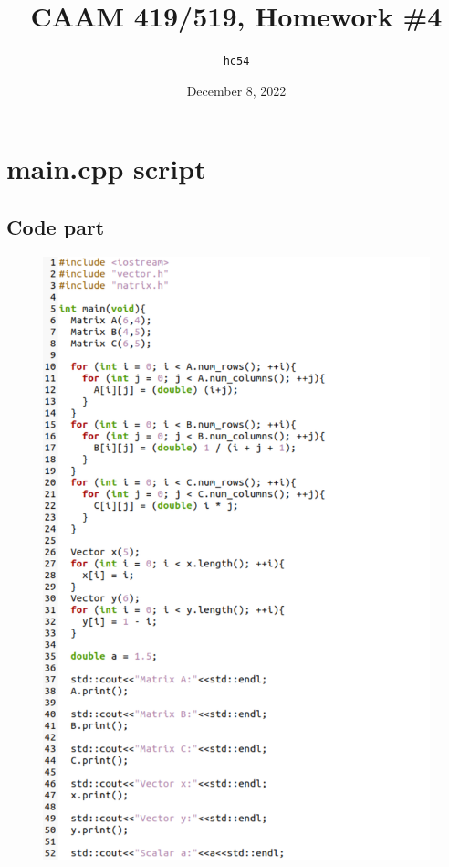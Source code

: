 \documentclass[10pt,a4paper]{article}
\title{CAAM 419/519, Homework \#4}
\author{\texttt{hc54}}
\date{December 8, 2022}
\begin{document}
\maketitle

\section{main.cpp script}
\subsection{Code part}
\begin{figure}[!ht]
        \centering \includegraphics[scale=0.8]{figures/code1.png}
\end{figure}
\end{document}
